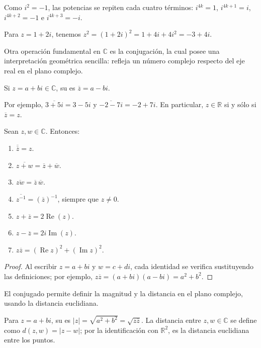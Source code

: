 \begin{example}
Como $i^2=-1$, las potencias se repiten cada cuatro términos:
$i^{4k}=1$, $i^{4k+1}=i$, $i^{4k+2}=-1$ e $i^{4k+3}=-i$.
\end{example}
\begin{example}
Para $z=1+2i$, tenemos $z^2=(1+2i)^2=1+4i+4i^2=-3+4i$.
\end{example}
Otra operación fundamental en $\mathbb{C}$ es la conjugación, la cual posee una interpretación geométrica sencilla: refleja un número complejo respecto del eje real en el plano complejo.
\begin{definition}
Si $z=a+bi\in\mathbb{C}$, su  es $\overline{z}=a-bi$.
\end{definition}
\begin{example}
Por ejemplo, $\overline{3+5i}=3-5i$ y $\overline{-2-7i}=-2+7i$.
En particular, $z\in\mathbb{R}$ si y sólo si $\overline{z}=z$.
\end{example}
\begin{proposition}
Sean $z,w\in\mathbb{C}$. Entonces:
\begin{enumerate}
\item[a)] $\overline{\overline{z}}=z$.
\item[b)] $\overline{z+w}=\overline{z}+\overline{w}$.
\item[c)] $\overline{zw}=\overline{z}\,\overline{w}$.
\item[d)] $\overline{z^{-1}}=(\overline{z})^{-1}$, siempre que $z\neq0$.
\item[e)] $z+\overline{z}=2\operatorname{Re}(z)$.
\item[f)] $z-\overline{z}=2i\operatorname{Im}(z)$.
\item[g)] $z\overline{z}=(\operatorname{Re}z)^2+(\operatorname{Im}z)^2$.
\end{enumerate}
\end{proposition}
\begin{proof}
Al escribir $z=a+bi$ y $w=c+di$, cada identidad se verifica sustituyendo las definiciones; por ejemplo,
$z\overline{z}=(a+bi)(a-bi)=a^2+b^2$.
\end{proof}
El conjugado permite definir la magnitud y la distancia en el plano complejo, usando la distancia euclidiana.
\begin{definition}
Para $z=a+bi$, su  es $|z|=\sqrt{a^2+b^2}=\sqrt{z\overline{z}}$.
La distancia entre $z,w\in\mathbb{C}$ se define como $d(z,w)=|z-w|$; por la
identificación con $\mathbb{R}^2$, es la distancia euclidiana entre los puntos.
\end{definition}
